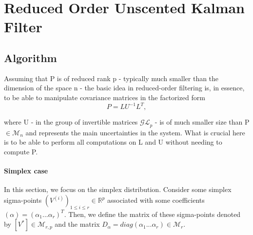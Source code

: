 \documentclass{tufte-book}
\newcounter{points}
\begin{document}
 \hypertarget{reduced_order_unscented_kalman_filter}{}\section{\-Reduced Order Unscented Kalman Filter}\label{reduced_order_unscented_kalman_filter}


\hypertarget{reduced_order_unscented_kalman_filter_algorithm5}{}\subsection{\-Algorithm}\label{reduced_order_unscented_kalman_filter_algorithm5}


\-Assuming that \-P is of reduced rank p - typically much smaller than the dimension of the space n - the basic idea in reduced-\/order filtering is, in essence, to be able to manipulate covariance matrices in the factorized form \[ P = LU^{-1}L^{T}, \]

where \-U - in the group of invertible matrices $\mathcal{GL}_{p}$ - is of much smaller size than \-P $\in \mathcal{M}_{n}$ and represents the main uncertainties in the system. \-What is crucial here is to be able to perform all computations on \-L and \-U without needing to compute \-P.

\hypertarget{reduced_order_unscented_kalman_filter_algorithm6}{}\paragraph{\-Simplex case}\label{reduced_order_unscented_kalman_filter_algorithm6}

\-In this section, we focus on the simplex distribution. \-Consider some simplex sigma-\/points $ (V^{(i)})_{1\leq i \leq r} \in \mathbb{R}^p $ associated with some coefficients $ (\alpha) = ( \alpha_1 ... \alpha_r )^T $. \-Then, we define the matrix of these sigma-\/points denoted by $ [V^{*}] \in \mathcal{M}_{r,p}$ and the matrix $ D_{\alpha} = diag( \alpha_1 ... \alpha_r ) \in \mathcal{M}_{r}$.
\end{document}
